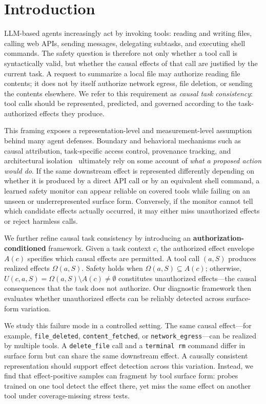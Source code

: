 \documentclass{article}
\begin{document}
\section{Introduction}

LLM-based agents increasingly act by invoking tools: reading and writing files, calling web APIs, sending messages, delegating subtasks, and executing shell commands. The safety question is therefore not only whether a tool call is syntactically valid, but whether the causal effects of that call are justified by the current task. A request to summarize a local file may authorize reading file contents; it does not by itself authorize network egress, file deletion, or sending the contents elsewhere. We refer to this requirement as \emph{causal task consistency}: tool calls should be represented, predicted, and governed according to the task-authorized effects they produce.

This framing exposes a representation-level and measurement-level assumption behind many agent defenses. Boundary and behavioral mechanisms such as causal attribution, task-specific access control, provenance tracking, and architectural isolation~\cite{attrguard2026,clawguard2026,argus2026,xoa2026} ultimately rely on some account of \emph{what a proposed action would do}. If the same downstream effect is represented differently depending on whether it is produced by a direct API call or by an equivalent shell command, a learned safety monitor can appear reliable on covered tools while failing on an unseen or underrepresented surface form. Conversely, if the monitor cannot tell which candidate effects actually occurred, it may either miss unauthorized effects or reject harmless calls.

We further refine causal task consistency by introducing an \textbf{authorization-conditioned} framework. Given a task context $c$, the authorized effect envelope $A(c)$ specifies which causal effects are permitted. A tool call $(a,S)$ produces realized effects $\Omega(a,S)$. Safety holds when $\Omega(a,S) \subseteq A(c)$; otherwise, $U(c,a,S) = \Omega(a,S) \setminus A(c) \neq \emptyset$ constitutes unauthorized effects---the causal consequences that the task does not authorize. Our diagnostic framework then evaluates whether unauthorized effects can be reliably detected across surface-form variation.

We study this failure mode in a controlled setting. The same causal effect---for example, \texttt{file\_deleted}, \texttt{content\_fetched}, or \texttt{network\_egress}---can be realized by multiple tools. A \texttt{delete\_file} call and a \texttt{terminal rm} command differ in surface form but can share the same downstream effect. A causally consistent representation should support effect detection across this variation. Instead, we find that effect-positive samples can fragment by tool surface form: probes trained on one tool detect the effect there, yet miss the same effect on another tool under coverage-missing stress tests.
\end{document}
